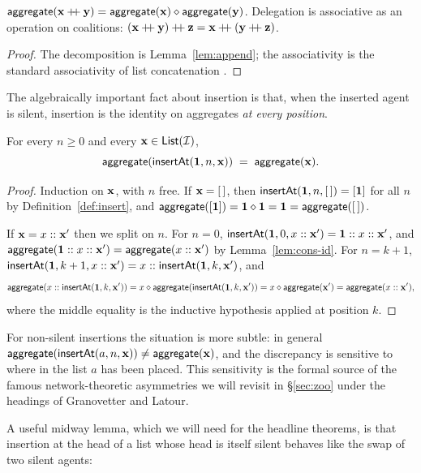 \begin{lemma}\label{lem:delegate}
$\mathsf{aggregate}(\mathbf{x} \mathbin{+\!\!+} \mathbf{y}) = \mathsf{aggregate}(\mathbf{x}) \mathbin{\diamond}
\mathsf{aggregate}(\mathbf{y})$. Delegation is associative as an operation on
coalitions: $(\xs \mathbin{+\!\!+} \ys) \mathbin{+\!\!+} \zs = \xs \mathbin{+\!\!+} (\ys
\mathbin{+\!\!+} \zs)$.
\end{lemma}

\begin{proof}
The decomposition is Lemma~\ref{lem:append}; the associativity is
the standard associativity of list concatenation \cite{Howie1995}.
\end{proof}

The algebraically important fact about insertion is that, when the
inserted agent is silent, insertion is the identity on aggregates
\emph{at every position}.

\begin{lemma}\label{lem:insert-id}
For every $n \geq 0$ and every $\mathbf{x} \in \mathsf{List}(\mathcal{I})$,
\[
  \mathsf{aggregate}(\mathsf{insertAt}(\mathbf{1}, n, \mathbf{x})) \;=\; \mathsf{aggregate}(\mathbf{x}).
\]
\end{lemma}

\begin{proof}
Induction on $\mathbf{x}$, with $n$ free. If $\mathbf{x} = [\,]$, then
$\mathsf{insertAt}(\mathbf{1}, n, [\,]) = [\mathbf{1}]$ for all $n$ by
Definition~\ref{def:insert}, and $\mathsf{aggregate}([\mathbf{1}]) = \mathbf{1} \mathbin{\diamond}
\mathbf{1} = \mathbf{1} = \mathsf{aggregate}([\,])$.

If $\mathbf{x} = x :: \mathbf{x}'$ then we split on $n$. For $n = 0$,
$\mathsf{insertAt}(\mathbf{1}, 0, x :: \mathbf{x}') = \mathbf{1} :: x :: \mathbf{x}'$, and
$\mathsf{aggregate}(\mathbf{1} :: x :: \mathbf{x}') = \mathsf{aggregate}(x :: \mathbf{x}')$ by
Lemma~\ref{lem:cons-id}. For $n = k + 1$, $\mathsf{insertAt}(\mathbf{1}, k+1, x ::
\mathbf{x}') = x :: \mathsf{insertAt}(\mathbf{1}, k, \mathbf{x}')$, and
\[
  \mathsf{aggregate}(x :: \mathsf{insertAt}(\mathbf{1}, k, \mathbf{x}'))
  = x \mathbin{\diamond} \mathsf{aggregate}(\mathsf{insertAt}(\mathbf{1}, k, \mathbf{x}'))
  = x \mathbin{\diamond} \mathsf{aggregate}(\mathbf{x}')
  = \mathsf{aggregate}(x :: \mathbf{x}'),
\]
where the middle equality is the inductive hypothesis applied at
position $k$.
\end{proof}

For non-silent insertions the situation is more subtle: in general
$\mathsf{aggregate}(\mathsf{insertAt}(a, n, \mathbf{x})) \neq \mathsf{aggregate}(\mathbf{x})$, and the
discrepancy is sensitive to where in the list $a$ has been placed.
This sensitivity is the formal source of the famous network-theoretic
asymmetries we will revisit in \S\ref{sec:zoo} under the headings of
Granovetter and Latour.

A useful midway lemma, which we will need for the headline theorems,
is that insertion at the head of a list whose head is itself silent
behaves like the swap of two silent agents:

